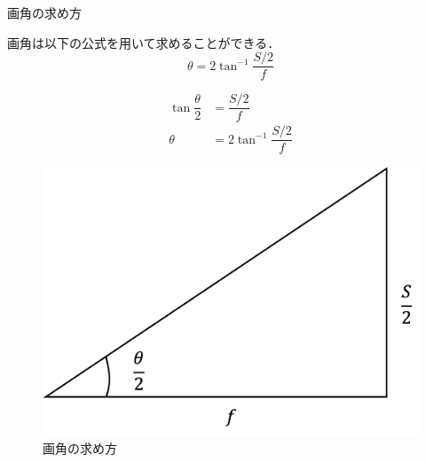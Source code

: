 \documentclass[8pt, jfont=ipaexm, t]{beamer} %
\begin{document}
\begin{frame}{画角の求め方}
  \begin{block}{}
    画角は以下の公式を用いて求めることができる．
    \begin{equation}
      \theta = 2 \tan^{-1}{\dfrac{S / 2}{f}}
    \end{equation}
  \end{block}

  \begin{block}{}
    \begin{align*}
      \tan{\dfrac{\theta}{2}} &= \dfrac{S / 2}{f} \\
      \theta &= 2 \tan^{-1}{\dfrac{S / 2}{f}}
    \end{align*}
  \end{block}

  \begin{figure}[H]
    \centering
    \includegraphics[scale=0.3]{figure/02.png}
    \caption{画角の求め方}
    \label{fig:02}
  \end{figure}
\end{frame}
\end{document}
